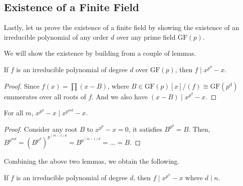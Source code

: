 \subsection{Existence of a Finite Field}
Lastly, let us prove the existence of a finite field by showing the existence of an irreducible polynomial of any order $d$ over any prime field $\mathrm{GF}(p)$.

We will show the existence by building from a couple of lemmas.
\begin{lemma}
    If $f$ is an irreducible polynomial of degree $d$ over $\mathrm{GF}(p)$, then $f\mid x^{p^d}-x$.
\end{lemma}
\begin{proof}
    Since $f(x)=\prod(x-B)$, where $B\in \mathrm{GF}(p)[x]/(f)\cong\mathrm{GF}(p^d)$ enumerates over all roots of $f$. And we also have $(x-B)\mid x^{p^d}-x$.
\end{proof}
\begin{lemma}
    For all $m$, $x^{p^d}-x\mid x^{p^{md}}-x$.
\end{lemma}
\begin{proof}
    Consider any root $B$ to $x^{p^d}-x=0$, it satisfies $B^{p^d}=B$. Then, $B^{p^{md}} = (B^{p^d})^{p^{(m-1)d}} = B^{p^{(m-1)d}} = \ldots = B$.
\end{proof}

Combining the above two lemmas, we obtain the following.
\begin{lemma}
    If $f$ is an irreducible polynomial of degree $d$, then $f\mid x^{p^{n}}-x$ where $d\mid n$.
\end{lemma}


